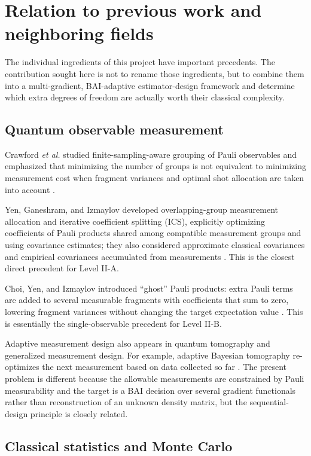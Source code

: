 \documentclass[11pt]{article}
\begin{document}
\section{Relation to previous work and neighboring fields}

The individual ingredients of this project have important precedents.  The contribution sought here is not to rename those ingredients, but to combine them into a multi-gradient, BAI-adaptive estimator-design framework and determine which extra degrees of freedom are actually worth their classical complexity.

\subsection{Quantum observable measurement}

Crawford \emph{et al.} studied finite-sampling-aware grouping of Pauli observables and emphasized that minimizing the number of groups is not equivalent to minimizing measurement cost when fragment variances and optimal shot allocation are taken into account \cite{Crawford2021}.

Yen, Ganeshram, and Izmaylov developed overlapping-group measurement allocation and iterative coefficient splitting (ICS), explicitly optimizing coefficients of Pauli products shared among compatible measurement groups and using covariance estimates; they also considered approximate classical covariances and empirical covariances accumulated from measurements \cite{Yen2023}.  This is the closest direct precedent for Level II-A.

Choi, Yen, and Izmaylov introduced ``ghost'' Pauli products: extra Pauli terms are added to several measurable fragments with coefficients that sum to zero, lowering fragment variances without changing the target expectation value \cite{Choi2022}.  This is essentially the single-observable precedent for Level II-B.

Adaptive measurement design also appears in quantum tomography and generalized measurement design.  For example, adaptive Bayesian tomography re-optimizes the next measurement based on data collected so far \cite{Huszar2012}.  The present problem is different because the allowable measurements are constrained by Pauli measurability and the target is a BAI decision over several gradient functionals rather than reconstruction of an unknown density matrix, but the sequential-design principle is closely related.

\subsection{Classical statistics and Monte Carlo}
\end{document}
